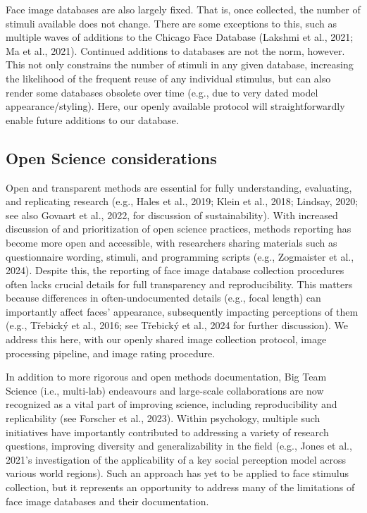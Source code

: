 \documentclass[
  letterpaper,
  DIV=11,
  numbers=noendperiod]{scrartcl}
\begin{document}
Face image databases are also largely fixed. That is, once collected,
the number of stimuli available does not change. There are some
exceptions to this, such as multiple waves of additions to the Chicago
Face Database (Lakshmi et al., 2021; Ma et al., 2021). Continued
additions to databases are not the norm, however. This not only
constrains the number of stimuli in any given database, increasing the
likelihood of the frequent reuse of any individual stimulus, but can
also render some databases obsolete over time (e.g., due to very dated
model appearance/styling). Here, our openly available protocol will
straightforwardly enable future additions to our database.

\subsection{Open Science
considerations}\label{open-science-considerations}

Open and transparent methods are essential for fully understanding,
evaluating, and replicating research (e.g., Hales et al., 2019; Klein et
al., 2018; Lindsay, 2020; see also Govaart et al., 2022, for discussion
of sustainability). With increased discussion of and prioritization of
open science practices, methods reporting has become more open and
accessible, with researchers sharing materials such as questionnaire
wording, stimuli, and programming scripts (e.g., Zogmaister et al.,
2024). Despite this, the reporting of face image database collection
procedures often lacks crucial details for full transparency and
reproducibility. This matters because differences in often-undocumented
details (e.g., focal length) can importantly affect faces' appearance,
subsequently impacting perceptions of them (e.g., Třebický et al., 2016;
see Třebický et al., 2024 for further discussion). We address this here,
with our openly shared image collection protocol, image processing
pipeline, and image rating procedure.

In addition to more rigorous and open methods documentation, Big Team
Science (i.e., multi-lab) endeavours and large-scale collaborations are
now recognized as a vital part of improving science, including
reproducibility and replicability (see Forscher et al., 2023). Within
psychology, multiple such initiatives have importantly contributed to
addressing a variety of research questions, improving diversity and
generalizability in the field (e.g., Jones et al., 2021's investigation
of the applicability of a key social perception model across various
world regions). Such an approach has yet to be applied to face stimulus
collection, but it represents an opportunity to address many of the
limitations of face image databases and their documentation.
\end{document}
